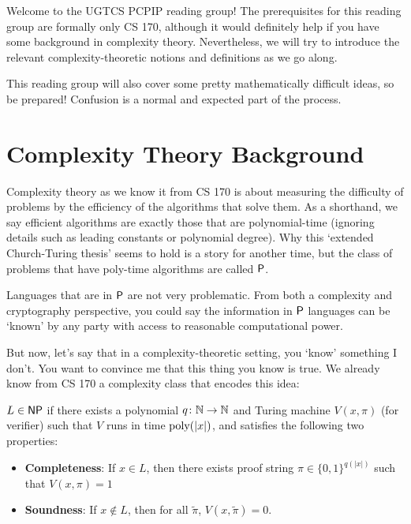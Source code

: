\documentclass{article}
\begin{document}

Welcome to the UGTCS PCPIP reading group!
The prerequisites for this reading group are formally only CS 170, although it would definitely
help if you have some background in complexity theory.
Nevertheless, we will try to introduce the relevant complexity-theoretic notions and definitions
as we go along. 

This reading group will also cover some pretty mathematically difficult ideas, so be prepared!
Confusion is a normal and expected part of the process.

\section{Complexity Theory Background}
Complexity theory as we know it from CS 170 is about measuring the difficulty of problems by
the efficiency of the algorithms that solve them.
As a shorthand, we say efficient algorithms are exactly those that are 
polynomial-time (ignoring details such as leading constants or polynomial degree).
Why this `extended Church-Turing thesis' seems to hold is a story for another time,
but the class of problems that have poly-time algorithms are called $\mathsf{P}$.

Languages that are in $\mathsf{P}$ are not very problematic.
From both a complexity and cryptography perspective, you could say the information in
$\mathsf{P}$ languages can be `known' by any party with access to reasonable computational power.

But now, let's say that in a complexity-theoretic setting, you `know' something I don't.
You want to convince me that this thing you know is true.
We already know from CS 170 a complexity class that encodes this idea:

\begin{definition}
    $L \in \mathsf{NP}$ if there exists a polynomial $q \colon \mathbb{N} \to \mathbb{N}$ and Turing machine $V(x, \pi)$ (for verifier) such that
    $V$ runs in time $\operatorname*{\textup{poly}}(|x|)$, and satisfies the following two properties:
    \begin{itemize}
        \item \textbf{Completeness}: If $x \in L$, then there exists proof string $\pi \in \{0, 1\}^{q(|x|)}$ such that $V(x, \pi) = 1$
        \item \textbf{Soundness}: If $x \notin L$, then for all $\tilde{\pi}$, $V(x, \tilde{\pi}) = 0$.
    \end{itemize}
\end{definition}
\end{document}
